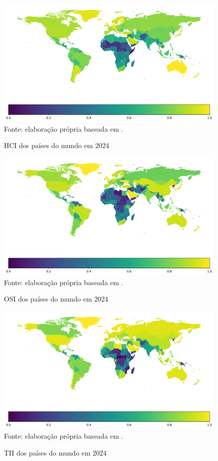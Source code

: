 \begin{figure}[H]
	\centering
	\caption{HCI dos países do mundo em 2024}
	\includegraphics[width=1\linewidth]{figuras/mapa_coropletico_paises_hci}
	\label{fig:mapa_coropletico_paises_hci}
	\footnotesize{Fonte: elaboração própria baseada em \cite{ONU_EGDI_dados}.}
\end{figure}

\begin{figure}[H]
	\centering
	\caption{OSI dos países do mundo em 2024}
	\includegraphics[width=1\linewidth]{figuras/mapa_coropletico_paises_osi}
	\label{fig:mapa_coropletico_paises_osi}
	\footnotesize{Fonte: elaboração própria baseada em \cite{ONU_EGDI_dados}.}
\end{figure}

\begin{figure}[H]
	\centering
	\caption{TII dos países do mundo em 2024}
	\includegraphics[width=1\linewidth]{figuras/mapa_coropletico_paises_tii}
	\label{fig:mapa_coropletico_paises_tii}
	\footnotesize{Fonte: elaboração própria baseada em \cite{ONU_EGDI_dados}.}
\end{figure}

